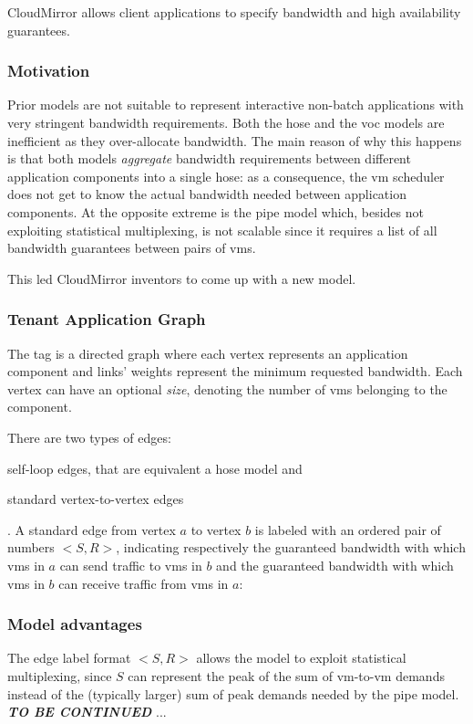 CloudMirror \cite{cloudmirror} allows client applications to specify bandwidth and high availability guarantees.

\subsubsection{Motivation}
Prior models are not suitable to represent interactive non-batch applications with very stringent bandwidth requirements.
Both the hose and the \gls{voc} models are inefficient as they over-allocate bandwidth.
The main reason of why this happens is that both models \textit{aggregate} bandwidth requirements between different application components into a single hose: as a consequence, the \gls{vm} scheduler does not get to know the actual bandwidth needed between application components. At the opposite extreme is the pipe model which, besides not exploiting statistical multiplexing, is not scalable since it requires a list of all bandwidth guarantees between pairs of \glspl{vm}.\par
This led CloudMirror \cite{cloudmirror} inventors to come up with a new model.

\subsubsection{Tenant Application Graph}
The \gls{tag} is a directed graph where each vertex represents an application component and links' weights represent the minimum requested bandwidth. Each vertex can have an optional \textit{size}, denoting the number of \glspl{vm} belonging to the component.\par
There are two types of edges:
\begin{mylist}
    \item self-loop edges, that are equivalent a hose model and
    \item standard vertex-to-vertex edges
\end{mylist}.
A standard edge from vertex $a$ to vertex $b$ is labeled with an ordered pair of numbers $<S, R>$, indicating respectively the guaranteed bandwidth with which \glspl{vm} in $a$ can send traffic to \glspl{vm} in $b$ and the guaranteed bandwidth with which \glspl{vm} in $b$ can receive traffic from \glspl{vm} in $a$: 

\subsubsection{Model advantages}
The edge label format $<S, R>$ allows the model to exploit statistical multiplexing, since $S$ can represent the peak of the sum of \gls{vm}-to-\gls{vm} demands instead of the (typically larger) sum of peak demands needed by the pipe model.
\textbf{\textit{TO BE CONTINUED}} ...

